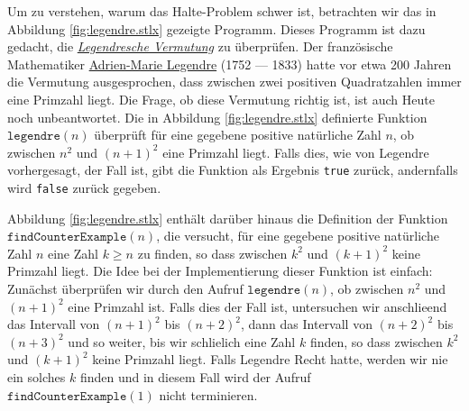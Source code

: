 Um zu verstehen, warum das Halte-Problem schwer ist, betrachten wir  
das in Abbildung \ref{fig:legendre.stlx} gezeigte Programm. 
Dieses Programm ist dazu gedacht, die
\href{http://de.wikipedia.org/wiki/Legendresche_Vermutung}{\emph{Legendresche Vermutung}} zu
\"{u}berpr\"{u}fen.  Der franz\"{o}sische 
Mathematiker  \href{http://de.wikipedia.org/wiki/Adrien-Marie_Legendre}{Adrien-Marie Legendre} 
(1752 --- 1833) hatte vor etwa 200 Jahren die Vermutung 
ausgesprochen, dass zwischen zwei positiven Quadratzahlen immer eine Primzahl liegt.  Die Frage, ob diese
Vermutung richtig ist, ist auch Heute noch unbeantwortet.  Die in Abbildung \ref{fig:legendre.stlx}
definierte Funktion $\texttt{legendre}(n)$ \"{u}berpr\"{u}ft f\"{u}r eine gegebene positive nat\"{u}rliche Zahl $n$,
ob zwischen $n^2$ und $(n+1)^2$ eine Primzahl liegt.  Falls dies, wie von Legendre vorhergesagt, der
Fall ist, gibt die Funktion als Ergebnis \texttt{true} zur\"{u}ck, andernfalls wird \texttt{false}
zur\"{u}ck gegeben.

Abbildung \ref{fig:legendre.stlx} enth\"{a}lt dar\"{u}ber hinaus die Definition der Funktion
$\texttt{findCounterExample}(n)$, die versucht, f\"{u}r eine gegebene positive nat\"{u}rliche Zahl $n$ eine
Zahl $k \geq n$ zu finden, so dass zwischen $k^2$ und $(k+1)^2$ keine Primzahl liegt.  Die Idee bei
der Implementierung dieser Funktion ist einfach:  Zun\"{a}chst \"{u}berpr\"{u}fen wir durch den Aufruf
$\texttt{legendre}(n)$, ob zwischen $n^2$ und $(n+1)^2$
eine Primzahl ist.  Falls dies der Fall ist, untersuchen wir anschlie\3end das Intervall von
$(n+1)^2$ bis $(n+2)^2$, dann das Intervall von 
$(n+2)^2$ bis $(n+3)^2$ und so weiter, bis wir schlie\3lich eine Zahl $k$ finden, so dass zwischen
$k^2$ und $(k+1)^2$ keine Primzahl liegt.  Falls Legendre Recht hatte, werden wir nie ein solches
$k$ finden und in diesem Fall wird der Aufruf $\texttt{findCounterExample}(1)$ nicht terminieren. 


